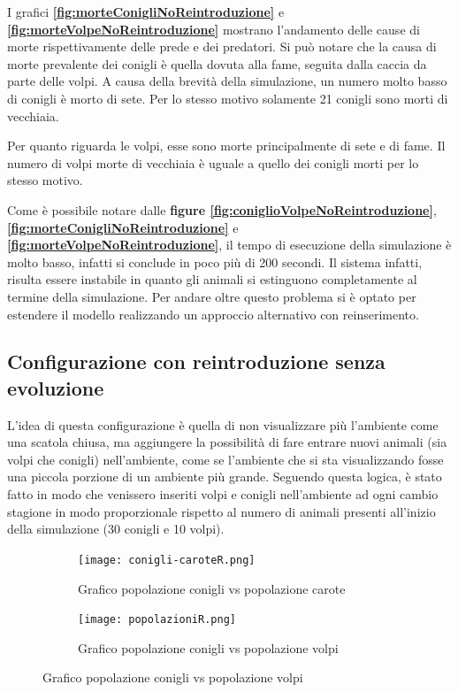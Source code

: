\documentclass[11pt]{article}
\begin{document}
\newpage

I grafici \textbf{\ref{fig:morteConigliNoReintroduzione}} e \textbf{\ref{fig:morteVolpeNoReintroduzione}}  mostrano l'andamento delle cause di morte rispettivamente delle prede e dei predatori. Si può notare che la causa di morte prevalente dei conigli è quella dovuta alla fame, seguita dalla caccia da parte delle volpi. A causa della brevità della simulazione, un numero molto basso di conigli è morto di sete. Per lo stesso motivo solamente 21 conigli sono morti di vecchiaia. 

Per quanto riguarda le volpi, esse sono morte principalmente di sete e di fame. Il numero di volpi morte di vecchiaia è uguale a quello dei conigli morti per lo stesso motivo. 



\noindent Come è possibile notare dalle \textbf{figure \ref{fig:coniglioVolpeNoReintroduzione}}, \textbf{\ref{fig:morteConigliNoReintroduzione}} e \textbf{\ref{fig:morteVolpeNoReintroduzione}}, il tempo di esecuzione della simulazione è molto basso, infatti si conclude in poco più di 200 secondi. Il sistema infatti, risulta essere instabile in quanto gli animali si estinguono completamente al termine della simulazione. 
Per andare oltre questo problema si è optato per estendere il modello realizzando un approccio alternativo con reinserimento.

\clearpage
\newpage


\subsection{Configurazione con reintroduzione senza evoluzione}
\label{sec:reintroduzioneNoEvoluzione}
L'idea di questa configurazione è quella di non visualizzare più l'ambiente come una scatola chiusa, ma aggiungere la possibilità di fare entrare nuovi animali (sia volpi che conigli) nell'ambiente, come se l'ambiente che si sta visualizzando fosse una piccola porzione di un ambiente più grande. 
Seguendo questa logica, è stato fatto in modo che venissero inseriti volpi e conigli nell'ambiente ad ogni cambio stagione in modo proporzionale rispetto al numero di animali presenti all'inizio della simulazione (30 conigli e 10 volpi).


\begin{figure}[h!]
	\hspace{-5mm}
	\begin{subfigure}{\textwidth}
            \centering
     \texttt{[image: conigli-caroteR.png]}
     \caption{Grafico popolazione conigli vs popolazione carote}
     \label{fig:conigliCaroteReintroduzione}
	\end{subfigure}
	\begin{subfigure}{\textwidth}
		\centering
     \texttt{[image: popolazioniR.png]}
     \caption{Grafico popolazione conigli vs popolazione volpi}
     \label{fig:conigliVolpiReintroduzione}
	\end{subfigure}
\end{figure}
\end{document}
